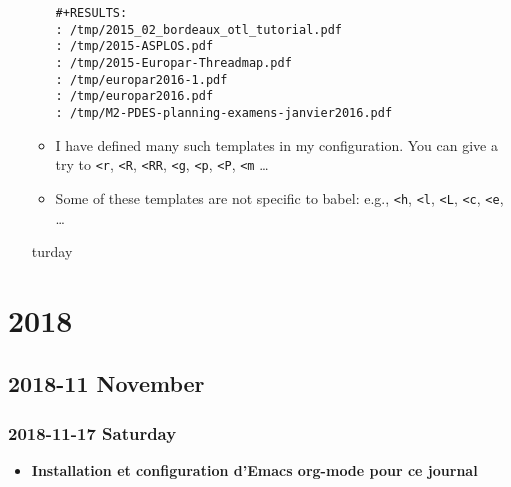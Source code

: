 \documentclass[a4paper]{article}
\begin{document}
\begin{itemize}
\begin{itemize}
\begin{verbatim}
#+RESULTS:
: /tmp/2015_02_bordeaux_otl_tutorial.pdf
: /tmp/2015-ASPLOS.pdf
: /tmp/2015-Europar-Threadmap.pdf
: /tmp/europar2016-1.pdf
: /tmp/europar2016.pdf
: /tmp/M2-PDES-planning-examens-janvier2016.pdf
\end{verbatim}
\item I have defined many such templates in my configuration. You can
give a try to \texttt{<r}, \texttt{<R}, \texttt{<RR}, \texttt{<g}, \texttt{<p}, \texttt{<P}, \texttt{<m} \ldots{}
\item Some of these templates are not specific to babel: e.g., \texttt{<h}, \texttt{<l},
\texttt{<L}, \texttt{<c}, \texttt{<e}, \ldots{}
\end{itemize}
turday
\end{itemize}

\section*{2018}
\label{sec:org008afda}
\subsection*{2018-11 November}
\label{sec:org27a5c66}
\subsubsection*{2018-11-17 Saturday}
\label{sec:org30c4845}
\begin{itemize}
\item \textbf{Installation et configuration d'Emacs org-mode pour ce journal}
\label{sec:org3a3ad8c}
\end{itemize}
\end{document}
